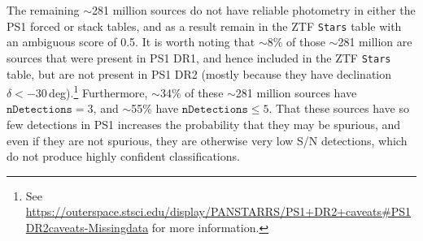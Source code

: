 \documentclass[twocolumn]{aastex63}
\begin{document}
The remaining $\sim$281 million sources do not have reliable photometry in
either the PS1 forced or stack tables, and as a result remain in the ZTF
\texttt{Stars} table with an ambiguous score of 0.5. It is worth noting that
$\sim$8\% of those $\sim$281 million are sources that were present in PS1 DR1,
and hence included in the ZTF \texttt{Stars} table, but are not present in PS1
DR2 (mostly because they have declination $\delta < -30$\,deg).\footnote{See
\url{https://outerspace.stsci.edu/display/PANSTARRS/PS1+DR2+caveats\#PS1DR2caveats-Missingdata} for more information.} Furthermore, $\sim$34\% of these
$\sim$281 million sources have $\mathtt{nDetections} = 3$, and $\sim$55\% have
$\mathtt{nDetections} \le 5$. That these sources have so few detections in PS1
increases the probability that they may be spurious, and even if they are not
spurious, they are otherwise very low S/N detections, which do not produce
highly confident classifications.






\end{document}
